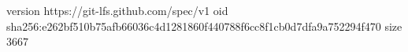version https://git-lfs.github.com/spec/v1
oid sha256:e262bf510b75afb66036c4d1281860f440788f6cc8f1cb0d7dfa9a752294f470
size 3667
